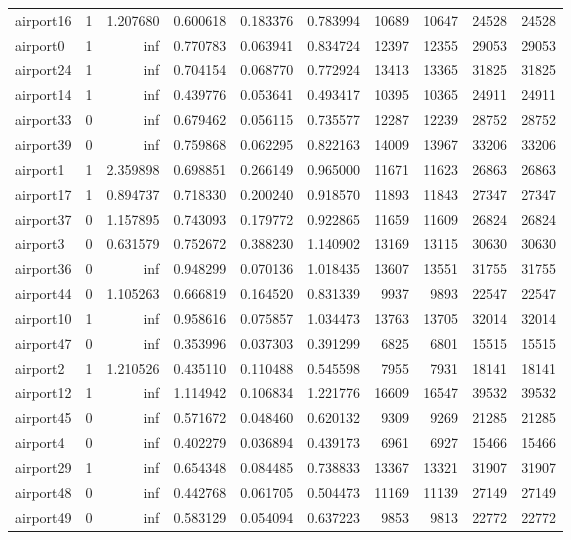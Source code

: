 \begin{longtable}{|l|r|r|r|r|r|r|r|r|r|}
airport16 & 1 & 1.207680 & 0.600618 & 0.183376 & 0.783994 & 10689 & 10647 & 24528 & 24528 \\
airport0 & 1 & inf & 0.770783 & 0.063941 & 0.834724 & 12397 & 12355 & 29053 & 29053 \\
airport24 & 1 & inf & 0.704154 & 0.068770 & 0.772924 & 13413 & 13365 & 31825 & 31825 \\
airport14 & 1 & inf & 0.439776 & 0.053641 & 0.493417 & 10395 & 10365 & 24911 & 24911 \\
airport33 & 0 & inf & 0.679462 & 0.056115 & 0.735577 & 12287 & 12239 & 28752 & 28752 \\
airport39 & 0 & inf & 0.759868 & 0.062295 & 0.822163 & 14009 & 13967 & 33206 & 33206 \\
airport1 & 1 & 2.359898 & 0.698851 & 0.266149 & 0.965000 & 11671 & 11623 & 26863 & 26863 \\
airport17 & 1 & 0.894737 & 0.718330 & 0.200240 & 0.918570 & 11893 & 11843 & 27347 & 27347 \\
airport37 & 0 & 1.157895 & 0.743093 & 0.179772 & 0.922865 & 11659 & 11609 & 26824 & 26824 \\
airport3 & 0 & 0.631579 & 0.752672 & 0.388230 & 1.140902 & 13169 & 13115 & 30630 & 30630 \\
airport36 & 0 & inf & 0.948299 & 0.070136 & 1.018435 & 13607 & 13551 & 31755 & 31755 \\
airport44 & 0 & 1.105263 & 0.666819 & 0.164520 & 0.831339 & 9937 & 9893 & 22547 & 22547 \\
airport10 & 1 & inf & 0.958616 & 0.075857 & 1.034473 & 13763 & 13705 & 32014 & 32014 \\
airport47 & 0 & inf & 0.353996 & 0.037303 & 0.391299 & 6825 & 6801 & 15515 & 15515 \\
airport2 & 1 & 1.210526 & 0.435110 & 0.110488 & 0.545598 & 7955 & 7931 & 18141 & 18141 \\
airport12 & 1 & inf & 1.114942 & 0.106834 & 1.221776 & 16609 & 16547 & 39532 & 39532 \\
airport45 & 0 & inf & 0.571672 & 0.048460 & 0.620132 & 9309 & 9269 & 21285 & 21285 \\
airport4 & 0 & inf & 0.402279 & 0.036894 & 0.439173 & 6961 & 6927 & 15466 & 15466 \\
airport29 & 1 & inf & 0.654348 & 0.084485 & 0.738833 & 13367 & 13321 & 31907 & 31907 \\
airport48 & 0 & inf & 0.442768 & 0.061705 & 0.504473 & 11169 & 11139 & 27149 & 27149 \\
airport49 & 0 & inf & 0.583129 & 0.054094 & 0.637223 & 9853 & 9813 & 22772 & 22772 \\

\end{longtable}
